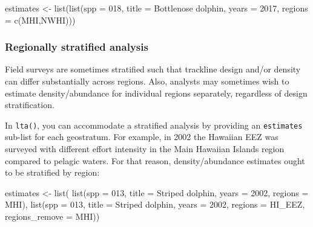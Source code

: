 \documentclass[
]{book}
\newenvironment{Shaded}{\begin{snugshade}}{\end{snugshade}}
\newcommand{\AttributeTok}[1]{\textcolor[rgb]{0.77,0.63,0.00}{#1}}
\newcommand{\DecValTok}[1]{\textcolor[rgb]{0.00,0.00,0.81}{#1}}
\newcommand{\FunctionTok}[1]{\textcolor[rgb]{0.00,0.00,0.00}{#1}}
\newcommand{\NormalTok}[1]{#1}
\newcommand{\OtherTok}[1]{\textcolor[rgb]{0.56,0.35,0.01}{#1}}
\newcommand{\StringTok}[1]{\textcolor[rgb]{0.31,0.60,0.02}{#1}}
\begin{document}
\begin{Shaded}
\begin{Highlighting}[]
\NormalTok{estimates }\OtherTok{\textless{}{-}} \FunctionTok{list}\NormalTok{(}\FunctionTok{list}\NormalTok{(}\AttributeTok{spp =} \StringTok{\textquotesingle{}018\textquotesingle{}}\NormalTok{,}
                       \AttributeTok{title =} \StringTok{\textquotesingle{}Bottlenose dolphin\textquotesingle{}}\NormalTok{,}
                       \AttributeTok{years =} \DecValTok{2017}\NormalTok{,}
                       \AttributeTok{regions =} \FunctionTok{c}\NormalTok{(}\StringTok{\textquotesingle{}MHI\textquotesingle{}}\NormalTok{,}\StringTok{\textquotesingle{}NWHI\textquotesingle{}}\NormalTok{)))}
\end{Highlighting}
\end{Shaded}

\hypertarget{regionally-stratified-analysis}{%
\subsubsection*{Regionally stratified analysis}\label{regionally-stratified-analysis}}

Field surveys are sometimes stratified such that trackline design and/or density can differ substantially across regions. Also, analysts may sometimes wish to estimate density/abundance for individual regions separately, regardless of design stratification.

In \texttt{lta()}, you can accommodate a stratified analysis by providing an \texttt{estimates} sub-list for each geostratum. For example, in 2002 the Hawaiian EEZ was surveyed with different effort intensity in the Main Hawaiian Islands region compared to pelagic waters. For that reason, density/abundance estimates ought to be stratified by region:

\begin{Shaded}
\begin{Highlighting}[]
\NormalTok{estimates }\OtherTok{\textless{}{-}} \FunctionTok{list}\NormalTok{(}
    \FunctionTok{list}\NormalTok{(}\AttributeTok{spp =} \StringTok{\textquotesingle{}013\textquotesingle{}}\NormalTok{,}
         \AttributeTok{title =} \StringTok{\textquotesingle{}Striped dolphin\textquotesingle{}}\NormalTok{,}
         \AttributeTok{years =} \DecValTok{2002}\NormalTok{,}
         \AttributeTok{regions =} \StringTok{\textquotesingle{}MHI\textquotesingle{}}\NormalTok{),}
    \FunctionTok{list}\NormalTok{(}\AttributeTok{spp =} \StringTok{\textquotesingle{}013\textquotesingle{}}\NormalTok{,}
         \AttributeTok{title =} \StringTok{\textquotesingle{}Striped dolphin\textquotesingle{}}\NormalTok{,}
         \AttributeTok{years =} \DecValTok{2002}\NormalTok{,}
         \AttributeTok{regions =} \StringTok{\textquotesingle{}HI\_EEZ\textquotesingle{}}\NormalTok{,}
         \AttributeTok{regions\_remove =} \StringTok{\textquotesingle{}MHI\textquotesingle{}}\NormalTok{))}
\end{Highlighting}
\end{Shaded}
\end{document}
